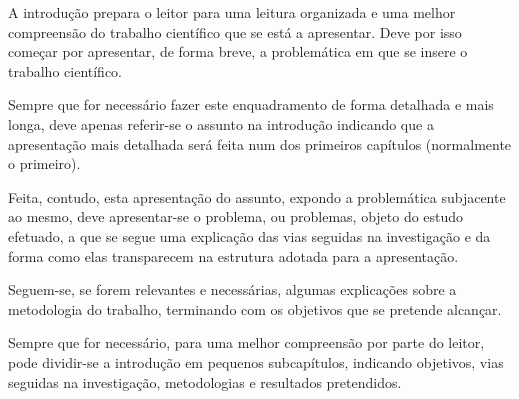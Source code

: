 \begin{introduction}


A introdução prepara o leitor para uma leitura organizada e uma melhor compreensão do trabalho científico que se está a apresentar. Deve por isso começar por apresentar, de forma breve, a problemática em que se insere o trabalho científico.

Sempre que for necessário fazer este enquadramento de forma detalhada e mais longa, deve apenas referir-se o assunto na introdução indicando que a apresentação mais detalhada será feita num dos primeiros capítulos (normalmente o primeiro).

Feita, contudo, esta apresentação do assunto, expondo a problemática subjacente ao mesmo, deve apresentar-se o problema, ou problemas, objeto do estudo efetuado, a que se segue uma explicação das vias seguidas na investigação e da forma como elas transparecem na estrutura adotada para a apresentação. 

Seguem-se, se forem relevantes e necessárias, algumas explicações sobre a metodologia do trabalho, terminando com os objetivos que se pretende alcançar. 

Sempre que for necessário, para uma melhor compreensão por parte do leitor, pode dividir-se a introdução em pequenos subcapítulos, indicando objetivos, vias seguidas na investigação, metodologias e resultados pretendidos.

\end{introduction}